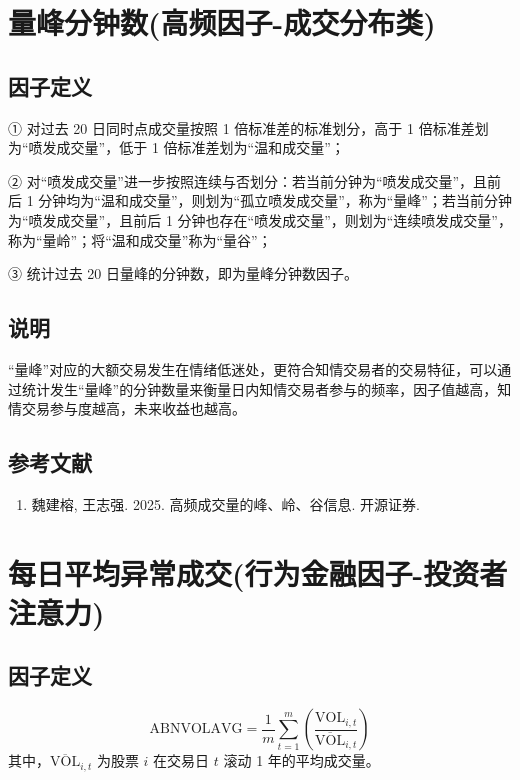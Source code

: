 \documentclass{article}
\begin{document}
\section{量峰分钟数(高频因子-成交分布类)}

\subsection{因子定义}

① 对过去 20 日同时点成交量按照 1 倍标准差的标准划分，高于 1 倍标准差划为“喷发成交量”，低于 1 倍标准差划为“温和成交量”；

② 对“喷发成交量”进一步按照连续与否划分：若当前分钟为“喷发成交量”，且前后 1 分钟均为“温和成交量”，则划为“孤立喷发成交量”，称为“量峰”；若当前分钟为“喷发成交量”，且前后 1 分钟也存在“喷发成交量”，则划为“连续喷发成交量”，称为“量岭”；将“温和成交量”称为“量谷”；

③ 统计过去 20 日量峰的分钟数，即为量峰分钟数因子。

\subsection{说明}
“量峰”对应的大额交易发生在情绪低迷处，更符合知情交易者的交易特征，可以通过统计发生“量峰”的分钟数量来衡量日内知情交易者参与的频率，因子值越高，知情交易参与度越高，未来收益也越高。

\subsection{参考文献}
\begin{enumerate}
    \item 魏建榕, 王志强. 2025. 高频成交量的峰、岭、谷信息. 开源证券.
\end{enumerate}

\section{每日平均异常成交(行为金融因子-投资者注意力)}

\subsection{因子定义}
\begin{equation}
    \mathrm{ABNVOLAVG} = \frac{1}{m} \sum_{t=1}^{m} \left( \frac{\mathrm{VOL}_{i,t}}{\overline{\mathrm{VOL}}_{i,t}} \right)
\end{equation}
其中，\(\overline{\mathrm{VOL}}_{i,t}\) 为股票 \( i \) 在交易日 \( t \) 滚动 1 年的平均成交量。
\end{document}
